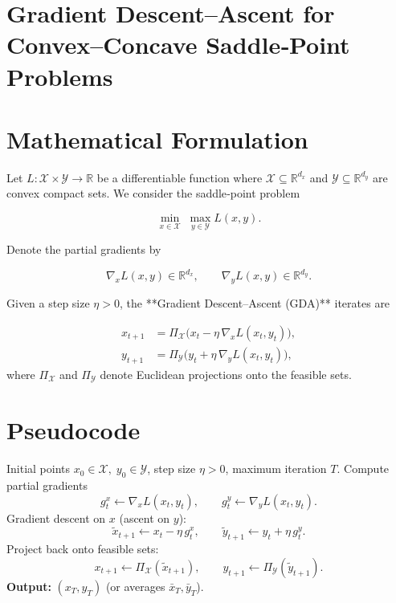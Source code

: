 \documentclass{article}
\newcommand{\R}{\mathbb{R}}
\begin{document}
\section*{Gradient Descent–Ascent for Convex–Concave Saddle‑Point Problems}

\section*{Mathematical Formulation}
Let $L:\mathcal{X}\times\mathcal{Y}\rightarrow\R$ be a differentiable function where
$\mathcal{X}\subseteq\R^{d_x}$ and $\mathcal{Y}\subseteq\R^{d_y}$ are convex compact sets.  
We consider the saddle‑point problem  

\[
\min_{x\in\mathcal{X}}\;\max_{y\in\mathcal{Y}} L(x,y).
\]

Denote the partial gradients by  

\[
\nabla_x L(x,y)\in\R^{d_x},\qquad \nabla_y L(x,y)\in\R^{d_y}.
\]

Given a step size $\eta>0$, the **Gradient Descent–Ascent (GDA)** iterates are  

\[
\boxed{
\begin{aligned}
x_{t+1} &= \Pi_{\mathcal{X}}\!\bigl(x_t-\eta\,\nabla_x L(x_t,y_t)\bigr),\\[2mm]
y_{t+1} &= \Pi_{\mathcal{Y}}\!\bigl(y_t+\eta\,\nabla_y L(x_t,y_t)\bigr),
\end{aligned}}
\tag{1}
\]
where $\Pi_{\mathcal{X}}$ and $\Pi_{\mathcal{Y}}$ denote Euclidean projections onto the feasible sets.

\section*{Pseudocode}
\begin{algorithm}[h]
\caption{Gradient Descent–Ascent (GDA)}
\begin{algorithmic}[1]
\Require Initial points $x_0\in\mathcal{X},\;y_0\in\mathcal{Y}$, step size $\eta>0$, maximum iteration $T$.
    \State Compute partial gradients 
    \[
    g^x_t \gets \nabla_x L(x_t,y_t),\qquad 
    g^y_t \gets \nabla_y L(x_t,y_t).
    \]
    \State Gradient descent on $x$ (ascent on $y$):
    \[
    \tilde{x}_{t+1}\gets x_t-\eta\,g^x_t,\qquad
    \tilde{y}_{t+1}\gets y_t+\eta\,g^y_t.
    \]
    \State Project back onto feasible sets:
    \[
    x_{t+1}\gets \Pi_{\mathcal{X}}(\tilde{x}_{t+1}),\qquad
    y_{t+1}\gets \Pi_{\mathcal{Y}}(\tilde{y}_{t+1}).
    \]
\EndFor
\State \textbf{Output:} $(x_T,y_T)$ (or averages $\bar{x}_T,\bar{y}_T$).
\end{algorithmic}
\end{algorithm}
\end{document}
